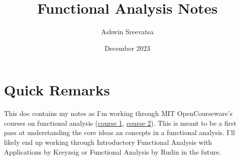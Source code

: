 \documentclass[answers,12pt]{exam}
\title{Functional Analysis Notes}
\author{Ashwin Sreevatsa}
\date{December 2023}
\begin{document}
\maketitle

\section*{Quick Remarks}
This doc contains my notes as I'm working through MIT OpenCourseware's courses on functional analysis (\href{https://ocw.mit.edu/courses/18-102-introduction-to-functional-analysis-spring-2021/}{course 1}, \href{https://ocw.mit.edu/courses/18-102-introduction-to-functional-analysis-spring-2009/}{course 2}).
This is meant to be a first pass at understanding the core ideas an concepts in a functional analysis.
I'll likely end up working through Introductory Functional Analysis with Applications by Kreyzsig or Functional Analysis by Rudin in the future.


\pagebreak
\end{document}
